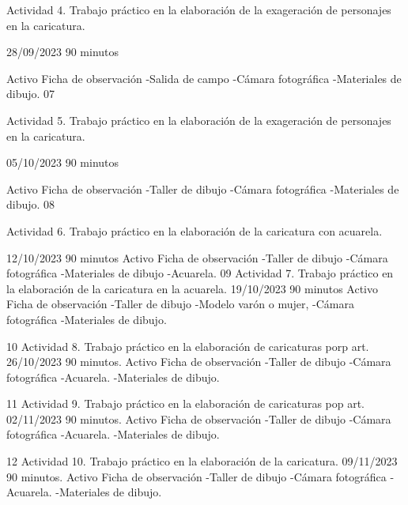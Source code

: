 \documentclass[12pt,a4paper]{article}
\begin{document}
Actividad 4.
Trabajo práctico en la elaboración de la exageración de personajes en la caricatura.

28/09/2023
90 minutos 

Activo
Ficha de observación 
-Salida de campo
-Cámara fotográfica
-Materiales de dibujo.
07


Actividad 5.
Trabajo práctico en la elaboración de la exageración de personajes en la caricatura.

05/10/2023
90 minutos 


Activo
Ficha de observación 
-Taller de dibujo
-Cámara fotográfica
-Materiales de dibujo.
08

Actividad 6.
Trabajo práctico en la elaboración de la caricatura con acuarela.

12/10/2023
90
minutos 
Activo
Ficha de observación 
-Taller de dibujo
-Cámara fotográfica
-Materiales de dibujo
-Acuarela.
09
Actividad 7.
Trabajo práctico en la elaboración de la caricatura en la acuarela.
19/10/2023
90 minutos 
Activo
Ficha de observación 
-Taller de dibujo
-Modelo varón o mujer,
-Cámara fotográfica
-Materiales de dibujo.

10
Actividad 8.
Trabajo práctico en la elaboración de caricaturas porp art.
26/10/2023
90
minutos.
Activo
Ficha de observación 
-Taller de dibujo
-Cámara fotográfica
-Acuarela.
-Materiales de dibujo.

11
Actividad 9.
Trabajo práctico en la elaboración de caricaturas pop art.
02/11/2023
90
minutos.
Activo
Ficha de observación 
-Taller de dibujo
-Cámara fotográfica
-Acuarela.
-Materiales de dibujo.

12
Actividad 10.
Trabajo práctico en la elaboración de la caricatura. 
09/11/2023
90
minutos.
Activo
Ficha de observación 
-Taller de dibujo
-Cámara fotográfica
-Acuarela.
-Materiales de dibujo.
\end{document}
